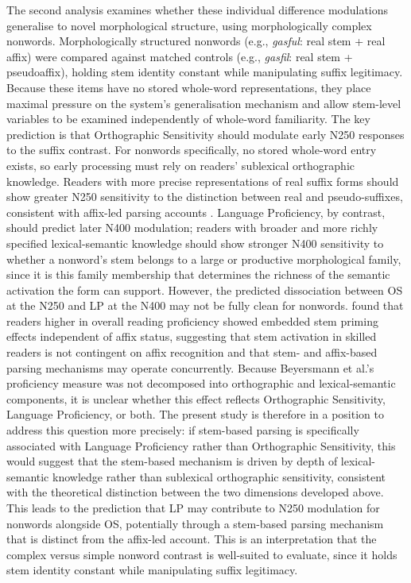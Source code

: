 	The second analysis examines whether these individual difference modulations generalise to novel morphological structure, using morphologically complex nonwords. Morphologically structured nonwords (e.g., \textit{gasful}: real stem + real affix) were compared against matched controls (e.g., \textit{gasfil}: real stem + pseudoaffix), holding stem identity constant while manipulating suffix legitimacy. Because these items have no stored whole-word representations, they place maximal pressure on the system's generalisation mechanism and allow stem-level variables to be examined independently of whole-word familiarity. The key prediction is that Orthographic Sensitivity should modulate early N250 responses to the suffix contrast. For nonwords specifically, no stored whole-word entry exists, so early processing must rely on readers' sublexical orthographic knowledge. Readers with more precise representations of real suffix forms should show greater N250 sensitivity to the distinction between real and pseudo-suffixes, consistent with affix-led parsing accounts \citep{taft_lexical_1975, rastleMorphologicalDecompositionBased2008}. Language Proficiency, by contrast, should predict later N400 modulation; readers with broader and more richly specified lexical-semantic knowledge should show stronger N400 sensitivity to whether a nonword's stem belongs to a large or productive morphological family, since it is this family membership that determines the richness of the semantic activation the form can support. However, the predicted dissociation between OS at the N250 and LP at the N400 may not be fully clean for nonwords. \citet{beyersmannEmbeddedStemPriming2016} found that readers higher in overall reading proficiency showed embedded stem priming effects independent of affix status, suggesting that stem activation in skilled readers is not contingent on affix recognition and that stem- and affix-based parsing mechanisms may operate concurrently. Because Beyersmann et al.'s proficiency measure was not decomposed into orthographic and lexical-semantic components, it is unclear whether this effect reflects Orthographic Sensitivity, Language Proficiency, or both. The present study is therefore in a position to address this question more precisely: if stem-based parsing is specifically associated with Language Proficiency rather than Orthographic Sensitivity, this would suggest that the stem-based mechanism is driven by depth of lexical-semantic knowledge rather than sublexical orthographic sensitivity, consistent with the theoretical distinction between the two dimensions developed above. This leads to the prediction that LP may contribute to N250 modulation for nonwords alongside OS, potentially through a stem-based parsing mechanism that is distinct from the affix-led account. This is an interpretation that the complex versus simple nonword contrast is well-suited to evaluate, since it holds stem identity constant while manipulating suffix legitimacy.